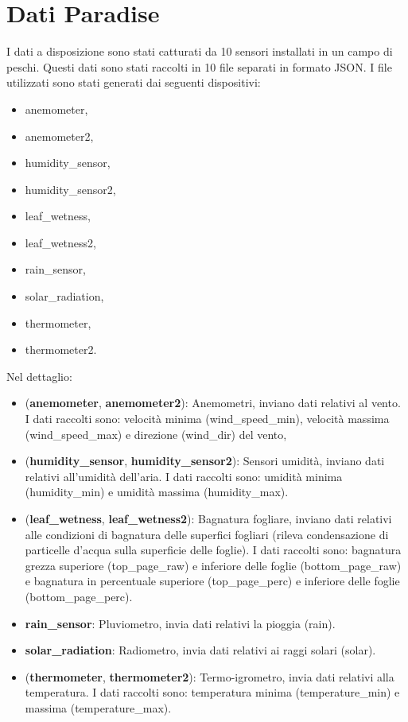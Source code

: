 \documentclass{article}
\begin{document}
\thispagestyle{empty}
\newpage

\tableofcontents

\thispagestyle{empty}

\clearpage
{}

\section{Dati Paradise}
I dati a disposizione sono stati catturati da 10 sensori installati in un campo di peschi. Questi dati sono stati raccolti in 10 file separati in formato JSON. I file utilizzati sono stati generati dai seguenti dispositivi:
\begin{itemize}[noitemsep]
  \item anemometer,
  \item anemometer2,
  \item humidity\_sensor,
  \item humidity\_sensor2,
  \item leaf\_wetness,
  \item leaf\_wetness2,
  \item rain\_sensor,
  \item solar\_radiation,
  \item thermometer,
  \item thermometer2.
\end{itemize}
Nel dettaglio:
\begin{itemize}[noitemsep]
  \item (\textbf{anemometer}, \textbf{anemometer2}): Anemometri, inviano dati relativi al vento. I dati raccolti sono: velocità minima (wind\_speed\_min), velocità massima (wind\_speed\_max) e direzione (wind\_dir) del vento,
  \item (\textbf{humidity\_sensor}, \textbf{humidity\_sensor2}): Sensori umidità, inviano dati relativi all'umidità dell'aria. I dati raccolti sono: umidità minima (humidity\_min) e umidità massima (humidity\_max).
  \item (\textbf{leaf\_wetness}, \textbf{leaf\_wetness2}): Bagnatura fogliare, inviano dati relativi alle condizioni di bagnatura delle superfici fogliari (rileva condensazione di particelle d'acqua sulla superficie delle foglie). I dati raccolti sono: bagnatura grezza superiore (top\_page\_raw) e inferiore delle foglie (bottom\_page\_raw) e bagnatura in percentuale superiore (top\_page\_perc) e inferiore delle foglie (bottom\_page\_perc).
  \item \textbf{rain\_sensor}: Pluviometro, invia dati relativi la pioggia (rain).
  \item \textbf{solar\_radiation}: Radiometro, invia dati relativi ai raggi solari (solar).
  \item (\textbf{thermometer}, \textbf{thermometer2}): Termo-igrometro, invia dati relativi alla temperatura. I dati raccolti sono: temperatura minima (temperature\_min) e massima (temperature\_max).
\end{itemize}
\end{document}
